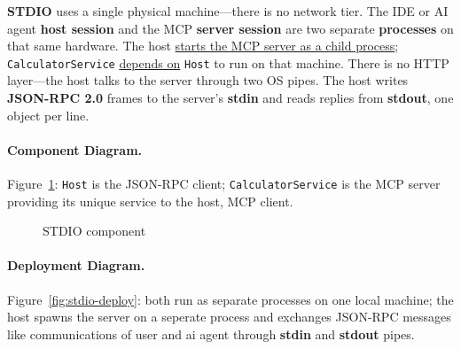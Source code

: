 \textbf{STDIO} uses a single physical machine---there is no network tier.
The IDE or AI agent \textbf{host session} and the MCP \textbf{server session} are two separate \textbf{processes} on that same hardware.
The host \uline{starts the MCP server as a child process}; \texttt{CalculatorService} \uline{depends on} \texttt{Host} to run on that machine.
There is no HTTP layer---the host talks to the server through two OS pipes.
The host writes \textbf{JSON-RPC 2.0} frames to the server's \textbf{stdin} and reads replies from \textbf{stdout}, one object per line.

\paragraph{Component Diagram.}
Figure~\ref{fig:stdio-component}: \texttt{Host} is the JSON-RPC client; \texttt{CalculatorService} is the MCP server 
providing its unique service to the host, MCP client.

\begin{figure}[htbp]
\centering
{}
\caption{STDIO component}
\label{fig:stdio-component}
\end{figure}

\paragraph{Deployment Diagram.}
Figure~\ref{fig:stdio-deploy}: both run as separate processes on one local machine; 
the host spawns the server on a seperate process and 
exchanges JSON-RPC messages like communications of user and ai agent through \textbf{stdin} and \textbf{stdout} pipes.

